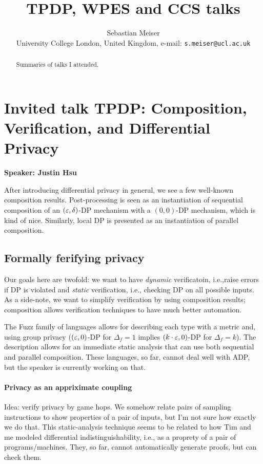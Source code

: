 \documentclass{article}
\title{TPDP, WPES and CCS talks}
\author{Sebastian Meiser\\%
 University College London, United Kingdom, e-mail: \texttt{s.meiser@ucl.ac.uk}\\%
}
\begin{document}
\maketitle

\begin{abstract}
Summaries of talks I attended.
\end{abstract}

\section{Invited talk TPDP: Composition, Verification, and Differential Privacy}
\noindent\textbf{Speaker: Justin Hsu}

After introducing differential privacy in general, we see a few well-known composition results.
Post-processing is seen as an instantiation of sequential composition of an $(\varepsilon,\delta)$-DP mechanism with a $(0,0)$-DP mechanism, which is kind of nice. Similarly, local DP is presented as an instantiation of parallel composition.

\subsection{Formally ferifying privacy}
Our goals here are twofold: we want to have \emph{dynamic} verificatoin, i.e.,raise errors if DP is violated and \emph{static} verification, i.e., checking DP on all possible inputs.
As a side-note, we want to simplify verification by using composition results; composition allows verification techniques to have much better automation.


The Fuzz family of languages allows for describing each type with a metric and, using group privacy ($(\varepsilon,0)$-DP for $\Delta_f = 1$ implies $(k\cdot \varepsilon,0)$-DP for $\Delta_f = k$). The description allows for an immediate static analysis that can use both sequential and parallel composition. These languages, so far, cannot deal well with ADP, but the speaker is currently working on that.

\paragraph{Privacy as an appriximate coupling}
Idea: verify privacy by game hops. We somehow relate pairs of sampling instructions to show properties of a pair of inputs, but I'm not sure how exactly we do that. This static-analysis technique seems to be related to how Tim and me modeled differential indistinguishability, i.e., as a proprety of a pair of programs/machines. They, so far, cannot automatically generate proofs, but can check them.
\end{document}
